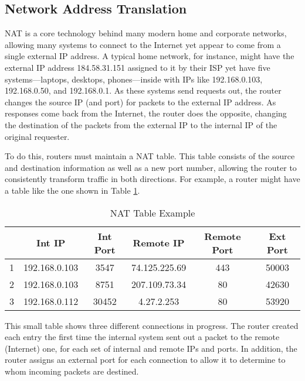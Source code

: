 \subsection{Network Address Translation}
\label{sec:nat}
\par \ac{NAT} is a core technology behind many modern home and corporate networks, allowing many systems to connect to the Internet yet appear to come from a single external \ac{IP} address. A typical home network, for instance, might have the external IP address 184.58.31.151 assigned to it by their \ac{ISP} yet have five systems---laptops, desktops, phones---inside with \acp{IP} like 192.168.0.103, 192.168.0.50, and 192.168.0.1. As these systems send requests out, the router changes the source IP (and port) for packets to the external IP address. As responses come back from the Internet, the router does the opposite, changing the destination of the packets from the external IP to the internal IP of the original requester.

\par To do this, routers must maintain a \ac{NAT} table. This table consists of the source and destination information as well as a new port number, allowing the router to consistently transform traffic in both directions. For example, a router might have a table like the one shown in Table \ref{tab:nat_example}.

\begin{table}
\caption{NAT Table Example}
\label{tab:nat_example}
\centering
\begin{tabular}{r|ccccc}
  & \textbf{Int IP}  & \textbf{Int Port}  & \textbf{Remote IP}  & \textbf{Remote Port}  & \textbf{Ext Port} \\
\hline
1 & 192.168.0.103 & 3547 & 74.125.225.69 & 443 & 50003\\
2 & 192.168.0.103 & 8751 & 207.109.73.34 & 80 & 42630\\
3 & 192.168.0.112 & 30452 & 4.27.2.253 & 80 & 53920
\end{tabular}
\end{table}

\par This small table shows three different connections in progress. The router created each entry the first time the internal system sent out a packet to the remote (Internet) one, for each set of internal and remote \acp{IP} and ports. In addition, the router assigns an external port for each connection to allow it to determine to whom incoming packets are destined.

